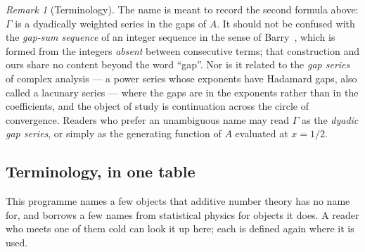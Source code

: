\documentclass[11pt,a4paper]{article}
\theoremstyle{plain}
\theoremstyle{definition}
\theoremstyle{remark}
\newtheorem{remark}[theorem]{Remark}
\begin{document}
\begin{remark}[Terminology]
The name is meant to record the second formula above: $\Gamma$ is a dyadically
weighted series in the gaps of $A$. It should not be confused with the
\emph{gap-sum sequence} of an integer sequence in the sense of Barry~\cite{Ba21},
which is formed from the integers \emph{absent} between consecutive terms; that
construction and ours share no content beyond the word ``gap''. Nor is it related
to the \emph{gap series} of complex analysis --- a power series whose exponents
have Hadamard gaps, also called a lacunary series --- where the gaps are in the
exponents rather than in the coefficients, and the object of study is
continuation across the circle of convergence.
Readers who prefer an unambiguous name may read $\Gamma$ as the
\emph{dyadic gap series}, or simply as the generating function of $A$ evaluated
at $x=1/2$.
\end{remark}

\subsection{Terminology, in one table}\label{sec:terminology}

This programme names a few objects that additive number theory has no name for,
and borrows a few names from statistical physics for objects it does. A reader
who meets one of them cold can look it up here; each is defined again where it
is used.
\end{document}
